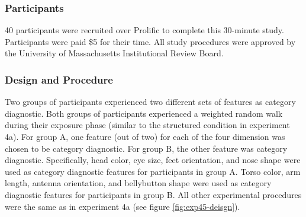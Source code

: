 \subsubsection*{Participants}
40 participants were recruited over Prolific to complete this 30-minute study. Participants were paid \$5 for their time. All study procedures were approved by the University of Massachusetts Institutional Review Board. 

\subsubsection*{Design and Procedure}
Two groups of participants experienced two different sets of features as category diagnostic. Both groups of participants experienced a weighted random walk during their exposure phase (similar to the structured condition in experiment 4a). For group A, one feature (out of two) for each of the four dimension was chosen to be category diagnostic. For group B, the other feature was category diagnostic. Specifically, head color, eye size, feet orientation, and nose shape were used as category diagnostic features for participants in group A. Torso color, arm length, antenna orientation, and bellybutton shape were used as category diagnostic features for participants in group B. All other experimental procedures were the same as in experiment 4a (see figure \ref{fig:exp45-deisgn}). 


